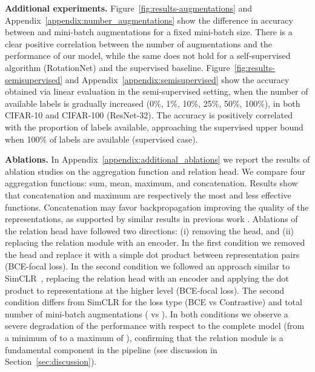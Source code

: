 \documentclass{article}
\begin{document}
\textbf{Additional experiments.}
Figure~\ref{fig:results-augmentations} and Appendix~\ref{appendix:number_augmentations} show the difference in accuracy between  and  mini-batch augmentations for a fixed mini-batch size. There is a clear positive correlation between the number of augmentations and the performance of our model, while the same does not hold for a self-supervised algorithm (RotationNet) and the supervised baseline.
Figure~\ref{fig:results-semisupervised} and Appendix~\ref{appendix:semisupervised} show the accuracy obtained via linear evaluation in the semi-supervised setting, when the number of available labels is gradually increased (0\%, 1\%, 10\%, 25\%, 50\%, 100\%), in both CIFAR-10 and CIFAR-100 (ResNet-32). The accuracy is positively correlated with the proportion of labels available, approaching the supervised upper bound when 100\% of labels are available (supervised case).

\textbf{Ablations.} In Appendix~\ref{appendix:additional_ablations} we report the results of ablation studies on the aggregation function and relation head. We compare four aggregation functions: sum, mean, maximum, and concatenation. Results show that concatenation and maximum are respectively the most and less effective functions. Concatenation may favor backpropagation improving the quality of the representations, as supported by similar results in previous work \citep{sung2018learning}. Ablations of the relation head have followed two directions: (i) removing the head, and (ii) replacing the relation module with an encoder. In the first condition we removed the head and replace it with a simple dot product between representation pairs (BCE-focal loss). In the second condition we followed an approach similar to SimCLR~\citep{chen2020simple}, replacing the relation head with an encoder and applying the dot product to representations at the higher level (BCE-focal loss). The second condition differs from SimCLR for the loss type (BCE vs Contrastive) and total number of mini-batch augmentations ( vs ). In both conditions we observe a severe degradation of the performance with respect to the complete model (from a minimum of  to a maximum of ), confirming that the relation module is a fundamental component in the pipeline (see discussion in Section~\ref{sec:discussion}).
\end{document}
